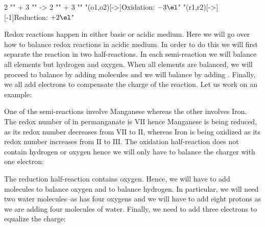 \documentclass[main.tex]{subfiles} %
\begin{document}
\begin{description}
\vspace{0.5cm}
 \begin{reaction*}
   2 "" \sld{} + 3 "" \aq{} 
    ->
  2 "" \aq{} + 3 "" \sld{}
  "\redox(o1,o2)[->]{\small Oxidation: $- 3\el$}"
  "\redox(r1,r2)[->][-1]{\small Reduction: $+ 2\el$}"
\end{reaction*}
\vspace{0.5cm}
 \item[\docfilehook{Balancing redox reactions in acidic medium}{}] Redox reactions happen in either basic or acidic medium. Here we will go over how to balance redox reactions in acidic medium. In order to do this we will first separate the reaction in two half-reactions. In each semi-reaction we will balance all elements but hydrogen and oxygen. When all elements are balanced, we will proceed to balance  by adding  molecules and we will balance  by adding . Finally, we all add electrons to compensate the charge of the reaction. Let us work on an example:
\begin{center}\end{center}
One of the semi-reactions involve Manganese whereas the other involves Iron. The redox number of  in permanganate is $\text{VII}$ hence Manganese is being reduced, as its redox number decreases from $\text{VII}$ to $\text{II}$, whereas Iron is being oxidized as its redox number increases from $\text{II}$ to $\text{III}$. The oxidation half-reaction does not contain hydrogen or oxygen hence we will only have to balance the charger with one electron:
\begin{center}\end{center}
The reduction half-reaction contains oxygen. Hence, we will have to add  molecules to balance oxygen and  to balance hydrogen. In particular, we will need two water molecules--as  has four oxygens and we will have to add eight protons as we are adding four molecules of water. Finally, we need to add three electrons to equalize the charge:


\end{description}
\end{document}
